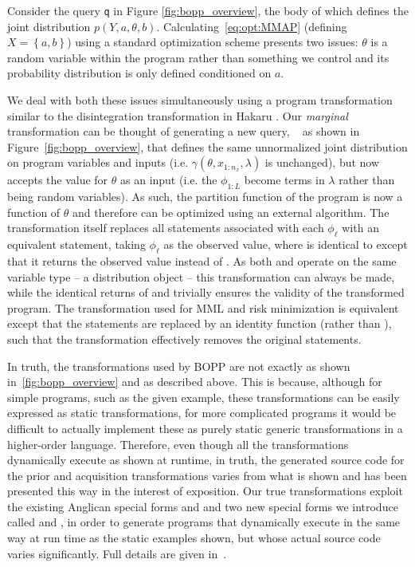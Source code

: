 
Consider the  query \texttt{q} in Figure \ref{fig:bopp_overview}, the body of which defines the joint distribution $p\left(Y,a,\theta,b\right)$.   Calculating~\eqref{eq:opt:MMAP} (defining $X=\left\{a,b\right\}$) using a standard optimization scheme presents two issues: $\theta$ is a random variable within the program rather than something we control and its probability distribution is only defined conditioned on $a$.

We deal with both these issues simultaneously using a program transformation similar to the disintegration transformation in Hakaru \citep{zinkov2016composing}. Our \emph{marginal} transformation can be thought of generating a new query, \qmarg~ as shown in Figure~\ref{fig:bopp_overview}, that defines the same unnormalized joint distribution on program variables and inputs (i.e. $\gamma(\theta,x_{1:n_x},\lambda)$ is unchanged), but now accepts the value for $\theta$ as an input (i.e. the $\phi_{1:L}$ become terms in $\lambda$ rather than being random variables).  As such, the partition function of the program is
now a function of $\theta$ and therefore can be optimized using an external algorithm.
The transformation itself replaces all \sample statements associated with each $\phi_{\ell}$ with an equivalent \observes statement, taking $\phi_{\ell}$ as the observed value, where \observes is identical to \observe except that it returns the observed value instead of .  As both \sample and \observe operate on the same variable type -- a distribution object -- this transformation can always be made, while the identical returns of \sample and \observes trivially ensures the validity of the transformed program.  The transformation used for MML and risk
minimization
is equivalent except that the \observe statements are replaced by an identity function (rather than \observes), such
that the transformation effectively removes the original \sample statements.

In truth, the transformations used by BOPP are not exactly as shown in~\ref{fig:bopp_overview}
and as described above.  This is because, although for simple programs, such as the given
example, these transformations can be easily expressed as static transformations, for more
complicated programs it would be difficult to actually implement these as purely static
generic transformations in a higher-order language.  Therefore, even though all the
transformations dynamically execute as shown at runtime, in truth, the generated source 
code for the prior and acquisition transformations varies from what is shown and has 
been presented this way in the interest of exposition.  Our true transformations exploit
the existing Anglican special forms  and  and two new
special forms we introduce called  and , in order to generate programs
that dynamically execute in the same way at run time as the static examples shown, but
whose actual source code varies significantly.  Full details are given in~\cite{rainforth2017boppArxiv}.

